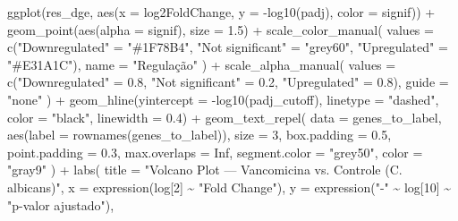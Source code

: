\documentclass[
  letterpaper,
  DIV=11,
  numbers=noendperiod]{scrreprt}
\newenvironment{Shaded}{\begin{snugshade}}{\end{snugshade}}
\newcommand{\AttributeTok}[1]{\textcolor[rgb]{0.40,0.45,0.13}{#1}}
\newcommand{\ConstantTok}[1]{\textcolor[rgb]{0.56,0.35,0.01}{#1}}
\newcommand{\DecValTok}[1]{\textcolor[rgb]{0.68,0.00,0.00}{#1}}
\newcommand{\FloatTok}[1]{\textcolor[rgb]{0.68,0.00,0.00}{#1}}
\newcommand{\FunctionTok}[1]{\textcolor[rgb]{0.28,0.35,0.67}{#1}}
\newcommand{\NormalTok}[1]{\textcolor[rgb]{0.00,0.23,0.31}{#1}}
\newcommand{\OtherTok}[1]{\textcolor[rgb]{0.00,0.23,0.31}{#1}}
\newcommand{\SpecialCharTok}[1]{\textcolor[rgb]{0.37,0.37,0.37}{#1}}
\newcommand{\StringTok}[1]{\textcolor[rgb]{0.13,0.47,0.30}{#1}}
\newcounter{none} %
\begin{document}
\begin{Shaded}
\begin{Highlighting}[]
\FunctionTok{ggplot}\NormalTok{(res\_dge, }\FunctionTok{aes}\NormalTok{(}\AttributeTok{x =}\NormalTok{ log2FoldChange, }\AttributeTok{y =} \SpecialCharTok{{-}}\FunctionTok{log10}\NormalTok{(padj), }\AttributeTok{color =}\NormalTok{ signif)) }\SpecialCharTok{+}
  \FunctionTok{geom\_point}\NormalTok{(}\FunctionTok{aes}\NormalTok{(}\AttributeTok{alpha =}\NormalTok{ signif), }\AttributeTok{size =} \FloatTok{1.5}\NormalTok{) }\SpecialCharTok{+}
  \FunctionTok{scale\_color\_manual}\NormalTok{(}
    \AttributeTok{values =} \FunctionTok{c}\NormalTok{(}\StringTok{"Downregulated"} \OtherTok{=} \StringTok{"\#1F78B4"}\NormalTok{,}
               \StringTok{"Not significant"} \OtherTok{=} \StringTok{"grey60"}\NormalTok{,}
               \StringTok{"Upregulated"} \OtherTok{=} \StringTok{"\#E31A1C"}\NormalTok{),}
    \AttributeTok{name =} \StringTok{"Regulação"}
\NormalTok{  ) }\SpecialCharTok{+}
  \FunctionTok{scale\_alpha\_manual}\NormalTok{(}
    \AttributeTok{values =} \FunctionTok{c}\NormalTok{(}\StringTok{"Downregulated"} \OtherTok{=} \FloatTok{0.8}\NormalTok{,}
               \StringTok{"Not significant"} \OtherTok{=} \FloatTok{0.2}\NormalTok{,}
               \StringTok{"Upregulated"} \OtherTok{=} \FloatTok{0.8}\NormalTok{),}
    \AttributeTok{guide =} \StringTok{"none"}
\NormalTok{  ) }\SpecialCharTok{+}
  \FunctionTok{geom\_hline}\NormalTok{(}\AttributeTok{yintercept =} \SpecialCharTok{{-}}\FunctionTok{log10}\NormalTok{(padj\_cutoff),}
             \AttributeTok{linetype =} \StringTok{"dashed"}\NormalTok{, }\AttributeTok{color =} \StringTok{"black"}\NormalTok{, }\AttributeTok{linewidth =} \FloatTok{0.4}\NormalTok{) }\SpecialCharTok{+}
  \FunctionTok{geom\_text\_repel}\NormalTok{(}
    \AttributeTok{data =}\NormalTok{ genes\_to\_label,}
    \FunctionTok{aes}\NormalTok{(}\AttributeTok{label =} \FunctionTok{rownames}\NormalTok{(genes\_to\_label)),}
    \AttributeTok{size =} \DecValTok{3}\NormalTok{,}
    \AttributeTok{box.padding =} \FloatTok{0.5}\NormalTok{,}
    \AttributeTok{point.padding =} \FloatTok{0.3}\NormalTok{,}
    \AttributeTok{max.overlaps =} \ConstantTok{Inf}\NormalTok{,}
    \AttributeTok{segment.color =} \StringTok{"grey50"}\NormalTok{,}
    \AttributeTok{color =} \StringTok{"gray9"}
\NormalTok{  ) }\SpecialCharTok{+}
  \FunctionTok{labs}\NormalTok{(}
    \AttributeTok{title =} \StringTok{"Volcano Plot — Vancomicina vs. Controle (C. albicans)"}\NormalTok{,}
    \AttributeTok{x =} \FunctionTok{expression}\NormalTok{(log[}\DecValTok{2}\NormalTok{] }\SpecialCharTok{\textasciitilde{}} \StringTok{"Fold Change"}\NormalTok{),}
    \AttributeTok{y =} \FunctionTok{expression}\NormalTok{(}\StringTok{"{-}"} \SpecialCharTok{\textasciitilde{}}\NormalTok{ log[}\DecValTok{10}\NormalTok{] }\SpecialCharTok{\textasciitilde{}} \StringTok{"p{-}valor ajustado"}\NormalTok{),}

\end{Highlighting}
\end{Shaded}
\end{document}
